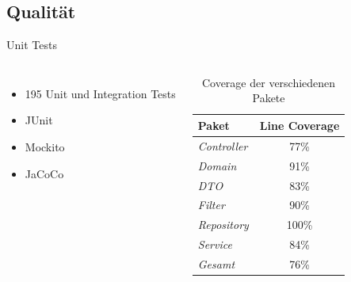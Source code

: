 \subsection{Qualität}
\begin{frame}{Unit Tests}
    \begin{columns}
         \begin{itemize}
            \item 195 Unit und Integration Tests
            \item JUnit
            \item Mockito
            \item JaCoCo
        \end{itemize}
         \begin{table}[h]
            \centering
            \renewcommand{\arraystretch}{1.3}
            \begin{tabular}{l|c}
                \textbf{Paket} & \textbf{Line Coverage} \\
                \hline
                \hline
                \textit{Controller}  & 77\% \\
                \textit{Domain}      & 91\%\\
                \textit{DTO}         & 83\%\\
                \textit{Filter}      & 90\% \\
                \textit{Repository}  & 100\% \\
                \textit{Service}     & 84\% \\
                \hline
                \textit{Gesamt}      & 76\% \\
            \end{tabular}
            \caption{Coverage der verschiedenen Pakete}
            \label{tab:progress}
        \end{table}
    \end{columns}
\end{frame}

